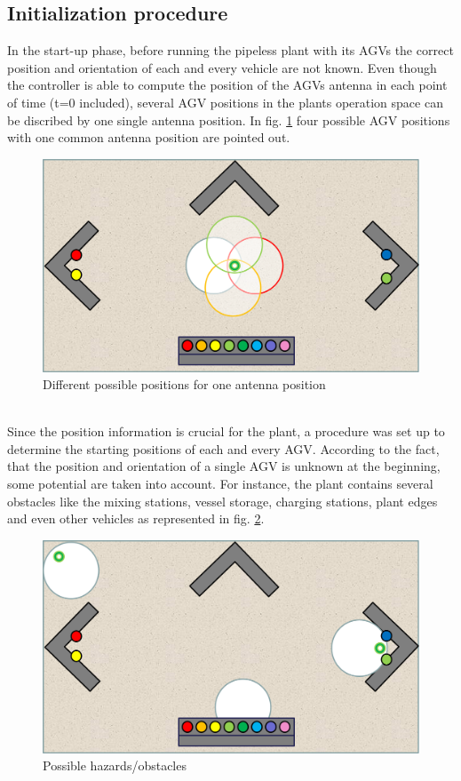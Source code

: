 \subsection{Initialization procedure}
In the start-up phase, before running the pipeless plant with its AGVs the correct position and orientation of each and every vehicle are not known. Even though the controller is able to compute the position of the AGVs antenna in each point of time (t=0 included),  several AGV positions in the plants operation space can be discribed by one single antenna position. In fig. \ref{possible_initial_positions} four possible AGV positions with one common antenna position are pointed out. \\
\begin{figure}[!htbp]
\centering
\includegraphics[width = 16cm]{Pictures/possible_initial_positions}
\caption{Different possible positions for one antenna position}
\label{possible_initial_positions}
\end{figure}\\
Since the position information is crucial for the plant, a procedure was set up to determine the starting positions of each and every AGV.
According to the fact, that the position and orientation of a single AGV is unknown at the beginning, some potential are taken into account. For instance, the plant contains several obstacles like the mixing stations, vessel storage, charging stations, plant edges and even other vehicles as represented in fig. \ref{hazards}.\pagebreak
\begin{figure}[!htbp]
\centering
\includegraphics[width = 16cm]{Pictures/hazards}
\caption{Possible hazards/obstacles}
\label{hazards}
\end{figure}\\
